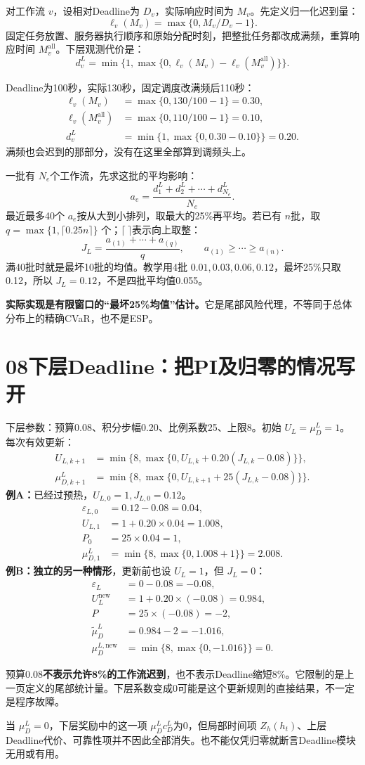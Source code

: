 \documentclass[UTF8,11pt,a4paper,fontset=fandol]{ctexart}
\newcommand{\lesson}[2]{\section*{#1\quad #2}}
\begin{document}
对工作流 $v$，设相对Deadline为 $D_v$，实际响应时间为 $M_v$。先定义归一化迟到量：
\[
\ell_v(M_v)=\max\{0,M_v/D_v-1\}.
\]
固定任务放置、服务器执行顺序和原始分配时刻，把整批任务都改成满频，重算响应时间 $M_v^{\mathrm{all}}$。下层观测代价是：
\[
d_v^L=\min\{1,\max\{0,\ell_v(M_v)-\ell_v(M_v^{\mathrm{all}})\}\}.
\]
\begin{examplebox}
Deadline为100秒，实际130秒，固定调度改满频后110秒：
\begin{align*}
\ell_v(M_v)&=\max\{0,130/100-1\}=0.30,\\
\ell_v(M_v^{\mathrm{all}})&=\max\{0,110/100-1\}=0.10,\\
d_v^L&=\min\{1,\max\{0,0.30-0.10\}\}=0.20.
\end{align*}
满频也会迟到的那部分，没有在这里全部算到调频头上。
\end{examplebox}
一批有 $N_e$个工作流，先求这批的平均影响：
\[
a_e=\frac{d_1^L+d_2^L+\cdots+d_{N_e}^L}{N_e}.
\]
最近最多40个 $a_e$按从大到小排列，取最大的25\%再平均。若已有 $n$批，取 $q=\max\{1,\lceil0.25n\rceil\}$ 个；$\lceil\ \rceil$表示向上取整：
\[
J_L=\frac{a_{(1)}+\cdots+a_{(q)}}q,\qquad a_{(1)}\ge\cdots\ge a_{(n)}.
\]
满40批时就是最坏10批的均值。教学用4批 $0.01,0.03,0.06,0.12$，最坏25\%只取0.12，所以 $J_L=0.12$，不是四批平均值0.055。

\textbf{实际实现是有限窗口的“最坏25\%均值”估计。}它是尾部风险代理，不等同于总体分布上的精确CVaR，也不是ESP。

\newpage
\lesson{08}{下层Deadline：把PI及归零的情况写开}
下层参数：预算0.08、积分步幅0.20、比例系数25、上限8。初始 $U_L=\mu_D^L=1$。每次有效更新：
\begin{align*}
U_{L,k+1}&=\min\{8,\max\{0,U_{L,k}+0.20(J_{L,k}-0.08)\}\},\\
\mu_{D,k+1}^L&=\min\{8,\max\{0,U_{L,k+1}+25(J_{L,k}-0.08)\}\}.
\end{align*}
\textbf{例A：}已经过预热，$U_{L,0}=1,J_{L,0}=0.12$。
\begin{align*}
\varepsilon_{L,0}&=0.12-0.08=0.04,\\
U_{L,1}&=1+0.20\times0.04=1.008,\\
P_0&=25\times0.04=1,\\
\mu_{D,1}^L&=\min\{8,\max\{0,1.008+1\}\}=2.008.
\end{align*}
\textbf{例B：独立的另一种情形}，更新前也设 $U_L=1$，但 $J_L=0$：
\begin{align*}
\varepsilon_L&=0-0.08=-0.08,\\
U_L^{\mathrm{new}}&=1+0.20\times(-0.08)=0.984,\\
P&=25\times(-0.08)=-2,\\
\widetilde\mu_D^L&=0.984-2=-1.016,\\
\mu_D^{L,\mathrm{new}}&=\min\{8,\max\{0,-1.016\}\}=0.
\end{align*}
\begin{remember}
预算0.08\textbf{不表示允许8\%的工作流迟到}，也不表示Deadline缩短8\%。它限制的是上一页定义的尾部统计量。下层系数变成0可能是这个更新规则的直接结果，不一定是程序故障。
\end{remember}
当 $\mu_D^L=0$，下层奖励中的这一项 $\mu_D^L c_D^L$为0，但局部时间项 $Z_h(h_t)$、上层Deadline代价、可靠性项并不因此全部消失。也不能仅凭归零就断言Deadline模块无用或有用。
\end{document}
